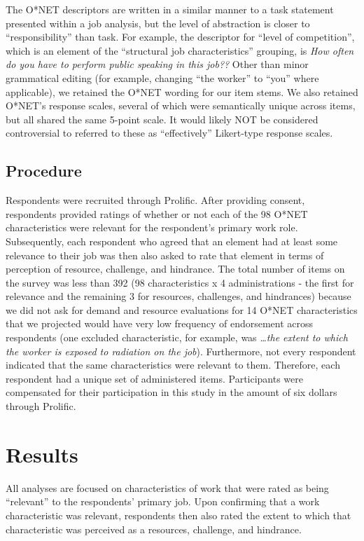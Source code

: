 \documentclass[
  jou]{apa6}
\begin{document}
The O*NET descriptors are written in a similar manner to a task statement presented within a job analysis, but the level of abstraction is closer to ``responsibility'' than task. For example, the descriptor for ``level of competition'', which is an element of the ``structural job characteristics'' grouping, is \emph{How often do you have to perform public speaking in this job??} Other than minor grammatical editing (for example, changing ``the worker'' to ``you'' where applicable), we retained the O*NET wording for our item stems. We also retained O*NET's response scales, several of which were semantically unique across items, but all shared the same 5-point scale. It would likely NOT be considered controversial to referred to these as ``effectively'' Likert-type response scales.

\hypertarget{procedure}{%
\subsection{Procedure}\label{procedure}}

Respondents were recruited through Prolific. After providing consent, respondents provided ratings of whether or not each of the 98 O*NET characteristics were relevant for the respondent's primary work role. Subsequently, each respondent who agreed that an element had at least some relevance to their job was then also asked to rate that element in terms of perception of resource, challenge, and hindrance. The total number of items on the survey was less than 392 (98 characteristics x 4 administrations - the first for relevance and the remaining 3 for resources, challenges, and hindrances) because we did not ask for demand and resource evaluations for 14 O*NET characteristics that we projected would have very low frequency of endorsement across respondents (one excluded characteristic, for example, was \emph{\ldots the extent to which the worker is exposed to radiation on the job}). Furthermore, not every respondent indicated that the same characteristics were relevant to them. Therefore, each respondent had a unique set of administered items. Participants were compensated for their participation in this study in the amount of six dollars through Prolific.

\hypertarget{results}{%
\section{Results}\label{results}}

All analyses are focused on characteristics of work that were rated as being ``relevant'' to the respondents' primary job. Upon confirming that a work characteristic was relevant, respondents then also rated the extent to which that characteristic was perceived as a resources, challenge, and hindrance.
\end{document}
